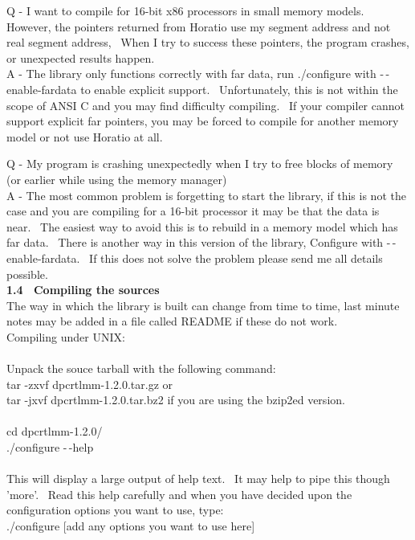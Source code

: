 \documentclass{article}
\begin{document}
\par Q - I want to compile for 16-bit x86 processors in small memory
models.~ However, the pointers returned from Horatio use my
segment address and not real segment address,~ When I try to
success these pointers, the program crashes, or unexpected results
happen.\\
A - The library only functions correctly with far data, run ./configure
with -$\,$-enable-fardata to enable explicit support.~ Unfortunately,
this is not within the scope of ANSI C and you may find difficulty
compiling.~ If your compiler cannot support explicit far pointers,
you may be forced to compile for another memory model or not use
Horatio at all.\\

\par Q - My program is crashing unexpectedly when I try to free blocks of
memory (or earlier while using the memory manager)
\\
A - The most common problem is forgetting to start the library, if
this is not the case and you are compiling for a 16-bit processor it
may
be that the data is near.~ The easiest way to avoid this is to
rebuild
in a memory model which has far data.~ There is another way in
this
version of the library, Configure with -$\,$-enable-fardata.~ If this
does not solve
the problem please send me all details possible.
\\
\textbf{1.4~ Compiling the sources}
\\
The way in which the library is
built can change from time to time,
last minute notes may be added in a file called README if these do not
work.\\
Compiling under UNIX:\\
\\
Unpack the souce tarball with the
following command:\\
tar -zxvf dpcrtlmm-1.2.0.tar.gz or\\
tar -jxvf dpcrtlmm-1.2.0.tar.bz2
if you are using the bzip2ed version.\\
\\
cd dpcrtlmm-1.2.0/\\
./configure -$\,$-help\\
\\
This will display a large output
of help text.~ It may help to
pipe this though 'more'.~ Read this help carefully and when you
have decided upon the configuration options you want to use, type:\\
./configure [add any options you
want to use here]\\
\end{document}
